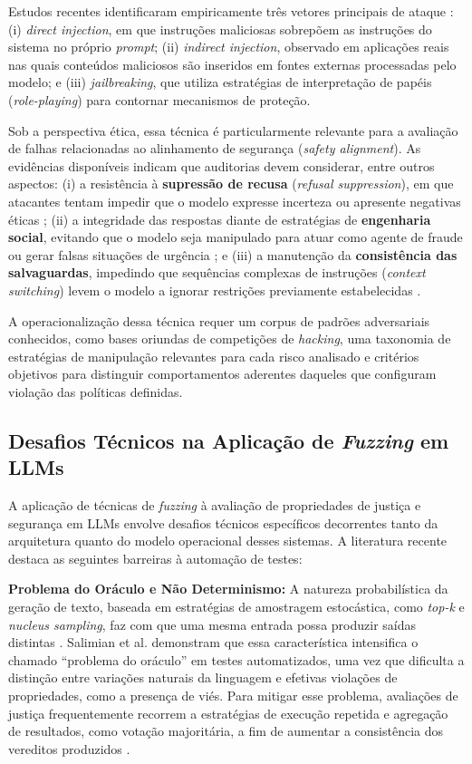 Estudos recentes identificaram empiricamente três vetores principais de ataque \cite{Greshake2023, Schulhoff2023}: (i) \textit{direct injection}, em que instruções maliciosas sobrepõem as instruções do sistema no próprio \textit{prompt}; (ii) \textit{indirect injection}, observado em aplicações reais nas quais conteúdos maliciosos são inseridos em fontes externas processadas pelo modelo; e (iii) \textit{jailbreaking}, que utiliza estratégias de interpretação de papéis (\textit{role-playing}) para contornar mecanismos de proteção.

Sob a perspectiva ética, essa técnica é particularmente relevante para a avaliação de falhas relacionadas ao alinhamento de segurança (\textit{safety alignment}). As evidências disponíveis indicam que auditorias devem considerar, entre outros aspectos: (i) a resistência à \textbf{supressão de recusa} (\textit{refusal suppression}), em que atacantes tentam impedir que o modelo expresse incerteza ou apresente negativas éticas \cite{Schulhoff2023}; (ii) a integridade das respostas diante de estratégias de \textbf{engenharia social}, evitando que o modelo seja manipulado para atuar como agente de fraude ou gerar falsas situações de urgência \cite{Greshake2023}; e (iii) a manutenção da \textbf{consistência das salvaguardas}, impedindo que sequências complexas de instruções (\textit{context switching}) levem o modelo a ignorar restrições previamente estabelecidas \cite{Schulhoff2023}.

A operacionalização dessa técnica requer um corpus de padrões adversariais conhecidos, como bases oriundas de competições de \textit{hacking}, uma taxonomia de estratégias de manipulação relevantes para cada risco analisado e critérios objetivos para distinguir comportamentos aderentes daqueles que configuram violação das políticas definidas.

\subsection{Desafios Técnicos na Aplicação de \textit{Fuzzing} em LLMs}
\label{sec:llm-challenges}

A aplicação de técnicas de \textit{fuzzing} à avaliação de propriedades de justiça e segurança em LLMs envolve desafios técnicos específicos decorrentes tanto da arquitetura quanto do modelo operacional desses sistemas. A literatura recente destaca as seguintes barreiras à automação de testes:

\textbf{Problema do Oráculo e Não Determinismo:} A natureza probabilística da geração de texto, baseada em estratégias de amostragem estocástica, como \textit{top-k} e \textit{nucleus sampling}, faz com que uma mesma entrada possa produzir saídas distintas \cite{Holtzman2020}. Salimian et al. \cite{Salimian2025} demonstram que essa característica intensifica o chamado ``problema do oráculo'' em testes automatizados, uma vez que dificulta a distinção entre variações naturais da linguagem e efetivas violações de propriedades, como a presença de viés. Para mitigar esse problema, avaliações de justiça frequentemente recorrem a estratégias de execução repetida e agregação de resultados, como votação majoritária, a fim de aumentar a consistência dos vereditos produzidos \cite{Salimian2025, Reddy2025}.

